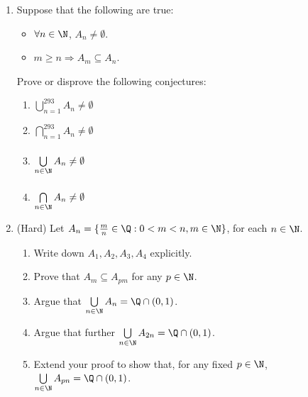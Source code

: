 \begin{enumerate}
  \item Suppose that the following are true:
  \begin{itemize}
    \item $\forall n\in\N$, $A_n\neq\emptyset$.
    \item $m\ge n\Longrightarrow A_m\subseteq A_n$.
  \end{itemize}
  Prove or disprove the following conjectures:\\
	\begin{minipage}{0.4\textwidth}
  \begin{enumerate}
    \item $\bigcup\limits_{n=1}^{293}A_n\neq\emptyset$
    \item $\bigcap\limits_{n=1}^{293}A_n\neq\emptyset$
	\end{enumerate}
	\end{minipage}
	\begin{minipage}{0.4\textwidth}
  \begin{enumerate}\setcounter{enumii}{2}
    \item $\bigcup\limits_{n\in\N}^{\phantom{293}}A_n\neq\emptyset$
		\item $\bigcap\limits_{n\in\N}^{\phantom{293}}A_n\neq\emptyset$
	\end{enumerate}
	\end{minipage}

	\item (Hard) Let $A_n=\{\frac mn\in\Q:0<m<n, m\in \N\}$, for each $n\in\N$.
	\begin{enumerate}
		\item Write down $A_1,A_2,A_3,A_4$ explicitly.
		\item Prove that $A_m\subseteq A_{pm}$ for any $p\in\N$.
		\item Argue that $\bigcup\limits_{n\in\N}A_n=\Q\cap (0,1)$.
		\item Argue that further $\bigcup\limits_{n\in\N}A_{2n}=\Q\cap (0,1)$.
		\item Extend your proof to show that, for any fixed $p\in\N$, $\bigcup\limits_{n\in\N}A_{pn}=\Q\cap (0,1)$.
	\end{enumerate}
	

\end{enumerate}
